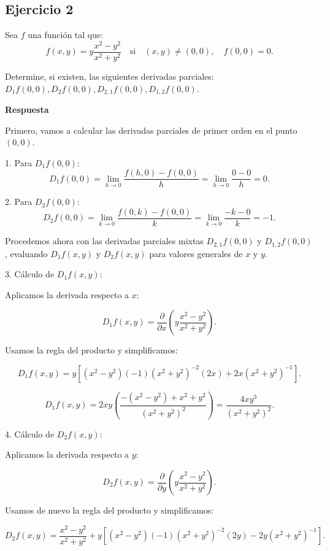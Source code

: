 \documentclass{report}
\begin{document}
    \subsection*{Ejercicio 2}
    Sea \( f \) una función tal que:
    \[ 
    f(x, y) = y \frac{x^2 - y^2}{x^2 + y^2} \quad \text{si} \quad (x, y) \neq (0,0), \quad f(0,0)=0. 
    \]

    Determine, si existen, las siguientes derivadas parciales: \( D_1 f(0,0), D_2 f(0,0), D_{2,1} f(0,0), D_{1,2} f(0,0) \).

    \textbf{Respuesta}

    Primero, vamos a calcular las derivadas parciales de primer orden en el punto \((0,0)\). 

    1. Para \( D_1 f(0,0) \):
    \[ 
    D_1 f(0, 0) = \lim_{h \to 0} \frac{f(h, 0) - f(0, 0)}{h} = \lim_{h \to 0} \frac{0 - 0}{h} = 0. 
    \]

    2. Para \( D_2 f(0,0) \):
    \[ 
    D_2 f(0, 0) = \lim_{k \to 0} \frac{f(0, k) - f(0, 0)}{k} = \lim_{k \to 0} \frac{-k - 0}{k} = -1. 
    \]

    Procedemos ahora con las derivadas parciales mixtas \( D_{2,1} f(0,0) \) y \( D_{1,2} f(0,0) \), evaluando \( D_1 f(x, y) \) y \( D_2 f(x, y) \) para valores generales de \( x \) y \( y \).

    3. Cálculo de \( D_1 f(x, y) \):

    Aplicamos la derivada respecto a \( x \):

    \[ 
    D_1 f(x, y) = \frac{\partial}{\partial x} \left( y \frac{x^2 - y^2}{x^2 + y^2} \right). 
    \]

    Usamos la regla del producto y simplificamos:

    \[ 
    D_1 f(x, y) = y \left[ \left( x^2 - y^2 \right) (-1) (x^2 + y^2)^{-2} (2x) + 2x (x^2 + y^2)^{-1} \right]. 
    \]

    \[ 
    D_1 f(x, y) = 2x y \left( \frac{-\left( x^2 - y^2 \right) + x^2 + y^2}{(x^2 + y^2)^2} \right) = \frac{4x y^3}{(x^2 + y^2)^2}. 
    \]

    4. Cálculo de \( D_2 f(x, y) \):

    Aplicamos la derivada respecto a \( y \):

    \[ 
    D_2 f(x, y) = \frac{\partial}{\partial y} \left( y \frac{x^2 - y^2}{x^2 + y^2} \right). 
    \]

    Usamos de nuevo la regla del producto y simplificamos:

    \[ 
    D_2 f(x, y) = \frac{x^2 - y^2}{x^2 + y^2} + y \left[ \left( x^2 - y^2 \right) (-1) (x^2 + y^2)^{-2} (2y) - 2y (x^2 + y^2)^{-1} \right]. 
    \]
\end{document}
